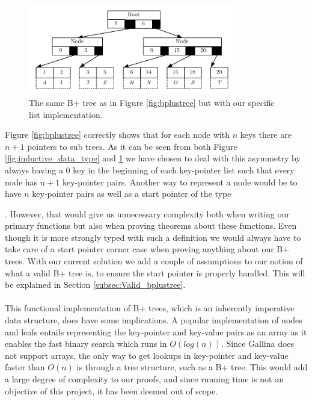 \begin{figure}
 \centering
   \includegraphics[width=90mm]{diagrams/BPlusTreeImpl.pdf}
 \caption{The same B+ tree as in Figure \ref{fig:bplustree} but with our specific list implementation.}
 \label{fig:bplustreeImpl}
\end{figure}

Figure \ref{fig:bplustree} correctly shows that for each node with $n$ keys there are $n+1$ pointers to sub trees. As it can be seen from both Figure \ref{fig:inductive_data_type} and \ref{fig:bplustreeImpl} we have chosen to deal with this asymmetry by always having a $0$ key in the beginning of each key-pointer list such that every node has $n+1$ key-pointer pairs. Another way to represent a node would be to have $n$ key-pointer pairs as well as a start pointer of the type \begin{coqdoccode}  \end{coqdoccode}. However, that would give us unnecessary complexity both when writing our primary functions but also when proving theorems about these functions. Even though it is more strongly typed with such a definition we would always have to take care of a start pointer corner case when proving anything about our B+ trees. With our current solution we add a couple of assumptions to our notion of what a valid B+ tree is, to ensure the start pointer is properly handled. This will be explained in Section \ref{subsec:Valid_bplustree}.
\paragraph{}
This functional implementation of B+ trees, which is an inherently imperative data structure, does have some implications. A popular implementation of nodes and leafs entails representing the key-pointer and key-value pairs as an array as it enables the fast binary search which runs in $O(log(n))$. Since Gallina does not support arrays, the only way to get lookups in key-pointer and key-value faster than $O(n)$ is through a tree structure, such as a B+ tree. This would add a large degree of complexity to our proofs, and since running time is not an objective of this project, it has been deemed out of scope.



